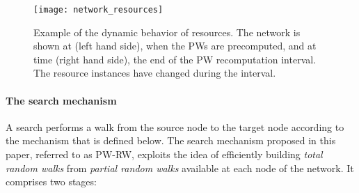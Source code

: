 \documentclass[]{elsarticle}
\begin{document}
\begin{figure}
 \centering
 \texttt{[image: network\_resources]}
 \caption{Example of the dynamic behavior of resources. The network is shown at  (left hand side), when the PWs are precomputed, and at time  (right hand side), the end of the PW recomputation interval. The resource instances have changed during the interval.} 
 \label{fig:resources}
\end{figure}

\paragraph{The search mechanism}
A search performs a walk from the source node to the target node according to the mechanism that is defined below. The search mechanism proposed in this paper, referred to as PW-RW, exploits the idea of efficiently building \emph{total random walks} from \emph{partial random walks} available at each node of the network. It comprises two stages:
\end{document}
